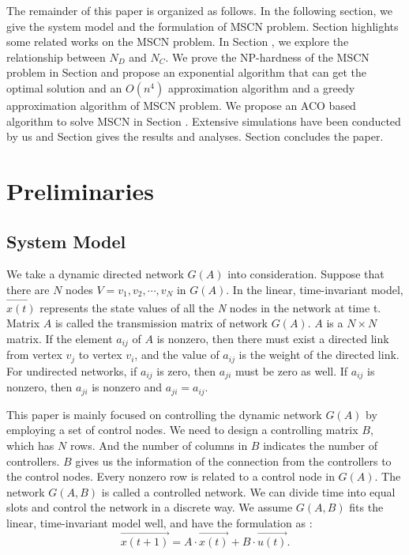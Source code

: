 \documentclass[10pt, conference, letterpaper]{IEEEtran}
\begin{document}
The remainder of this paper is organized as follows. In the following section, we give the system model and the formulation of MSCN problem. Section \uppercase\expandafter{} highlights some related works on the MSCN problem.
In Section \uppercase\expandafter{}, we explore the relationship between $N_D$ and $N_C$. We prove the NP-hardness of the MSCN problem in Section \uppercase\expandafter{} and propose an exponential algorithm that can get the optimal solution and an $O(n^4)$ approximation algorithm and a greedy approximation algorithm of MSCN problem. We propose an ACO based algorithm to solve MSCN in Section \uppercase\expandafter{}. Extensive simulations have been conducted by us and Section \uppercase\expandafter{} gives the results and analyses. Section \uppercase\expandafter{} concludes the paper.

\section{Preliminaries}
\label{sectionPreliminaries}
\subsection{System Model}

We take a dynamic directed network $G(A)$ into consideration. Suppose that there are $N$ nodes $V={v_1,v_2,\cdots,v_N}$ in $G(A)$. In the linear, time-invariant model, $\overrightarrow {x(t)}$ represents the state values of all the \emph{N} nodes in the network at time t. Matrix $A$ is called the transmission matrix of network $G(A)$. $A$ is a $N \times N $ matrix. If the element $a_{ij}$ of $A$ is nonzero, then there must exist a directed link from vertex $v_j$ to vertex $v_i$, and the value of $a_{ij}$ is the weight of the directed link. For
undirected networks, if $a_{ij}$ is zero, then $a_{ji}$ must be zero as well. If $a_{ij}$ is nonzero, then $a_{ji}$ is nonzero and $a_{ji} = a_{ij}$.

This paper is mainly focused on controlling the dynamic network $G(A)$ by employing a set of control nodes. We need to design a controlling matrix $B$, which has $N$ rows. And the number of columns in $B$ indicates the number of controllers. $B$ gives us the information of the connection from the controllers to the control nodes.
Every nonzero row is related to a control node in $G(A)$. The network $G(A,B)$ is called a controlled network. We can divide time into equal slots and control the network in a discrete way. We assume $G(A,B)$ fits the linear, time-invariant model well, and have the formulation as :
\begin{equation*}
\overrightarrow {x(t+1)} = A \cdot \overrightarrow {x(t)} + B \cdot \overrightarrow {u(t)}.
\end{equation*}
\end{document}
